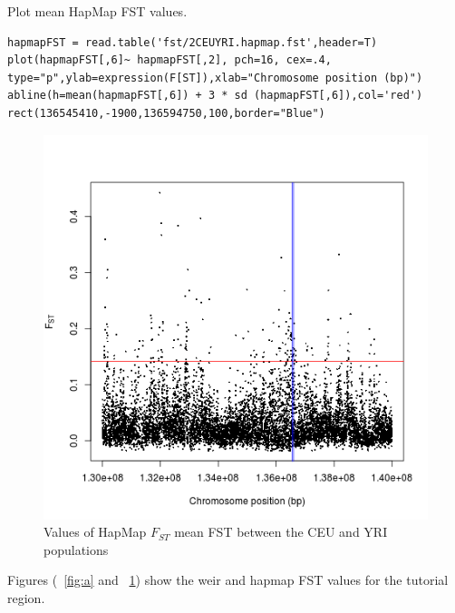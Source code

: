 \documentclass[a4paper,10pt]{article}
\begin{document}
\noindent
Plot mean HapMap FST values.\\
\begin{verbatim}
hapmapFST = read.table('fst/2CEUYRI.hapmap.fst',header=T) 
plot(hapmapFST[,6]~ hapmapFST[,2], pch=16, cex=.4, 
type="p",ylab=expression(F[ST]),xlab="Chromosome position (bp)") 
abline(h=mean(hapmapFST[,6]) + 3 * sd (hapmapFST[,6]),col='red')
rect(136545410,-1900,136594750,100,border="Blue") 
\end{verbatim}
\begin{figure}
\centering
\includegraphics{pictures/hapmapCEUYRI.png}
\caption{Values of HapMap $F_{ST}$ mean FST between the CEU and YRI populations}
\label{fig:hapmapfst}
\end{figure}

\noindent 
Figures (~\ref{fig:a} and ~\ref{fig:hapmapfst}) show the weir and hapmap FST values for the tutorial region.
\end{document}
